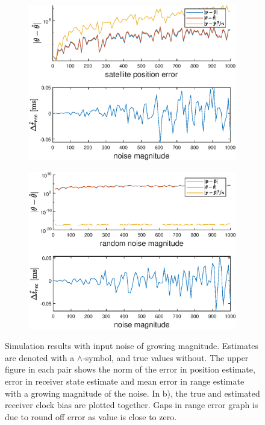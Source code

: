 \begin{figure}\ContinuedFloat
\begin{subfigure}{0.8\textwidth}
  \includegraphics[width=\linewidth]{Results/SimulationEstPos/satPos}  
\end{subfigure}
\begin{subfigure}{0.8\textwidth}
  \includegraphics[width=\linewidth]{Results/SimulationEstPos/Gaussian}
\end{subfigure}
\caption{Simulation results with input noise of growing magnitude. Estimates are denoted with a $\wedge$-symbol, and true values without. The upper figure in each pair shows the norm of the error in position estimate, error in receiver state estimate and mean error in range estimate with a growing magnitude of the noise. In b), the true and estimated receiver clock bias are plotted together. Gaps in range error graph is due to round off error as value is close to zero.}
\label{fig:sim_est_pos}
\end{figure}
